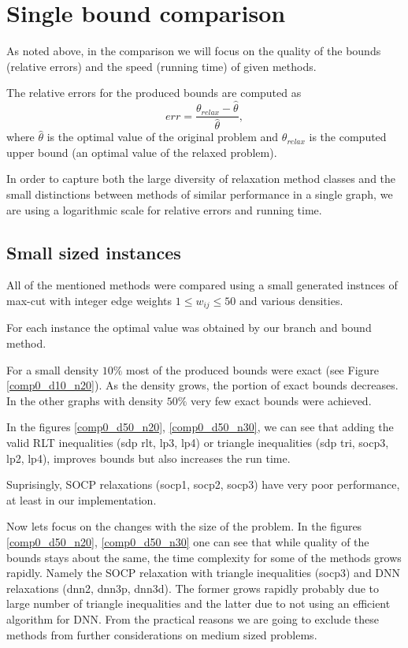 \documentclass[12pt]{book}
\theoremstyle{definition}
\begin{document}
\section{Single bound comparison}

As noted above, in the comparison we will focus on the quality of the bounds (relative errors) and the speed (running time) of given methods.

The relative errors for the produced bounds are computed as 
\begin{equation}
\label{relative_error}
err = \frac{\theta_{relax} - \hat{\theta}}{\hat{\theta}},
\end{equation}
where $\hat{\theta}$ is the optimal value of the original problem and $\theta_{relax}$ is the computed upper bound (an optimal value of the relaxed problem). 

In order to capture both the large diversity of relaxation method classes and the small distinctions between methods of similar performance in a single graph, we are using a logarithmic scale for relative errors and running time. 



\subsection{Small sized instances}
All of the mentioned methods were compared using a small generated instnces of max-cut with integer edge weights $1\leq w_{ij}\leq 50$
and various densities. 

For each instance the optimal value was obtained by our branch and bound method. 

For a small density $10\%$ most of the produced bounds were exact (see Figure \ref{comp0_d10_n20}). 
As the density grows, the portion of exact bounds decreases. In the other graphs with density $50\%$ very few exact bounds were achieved.

In the figures \ref{comp0_d50_n20}, \ref{comp0_d50_n30}, we can see that adding the valid RLT inequalities (sdp rlt, lp3, lp4) or triangle inequalities (sdp tri, socp3, lp2, lp4), improves bounds but also increases the run time.

Suprisingly, SOCP relaxations (socp1, socp2, socp3) have very poor performance, at least in our implementation.


Now lets focus on the changes with the size of the problem. In the figures \ref{comp0_d50_n20}, \ref{comp0_d50_n30} one can see that while quality of the bounds stays about the same, the time complexity for some of the methods grows rapidly. Namely the SOCP relaxation with triangle inequalities (socp3) and DNN relaxations (dnn2, dnn3p, dnn3d). The former grows rapidly probably due to large number of triangle inequalities and the latter due to not using an efficient algorithm for DNN. From the practical reasons we are going to exclude these methods from further considerations on medium sized problems.
\end{document}

